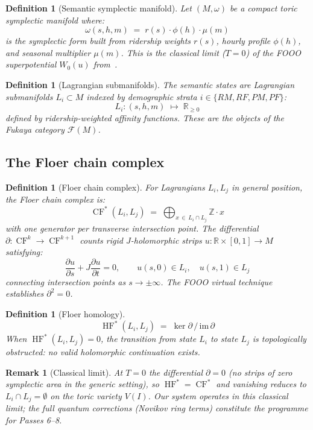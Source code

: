 \documentclass[11pt,a4paper]{article}
\newtheorem{definition}[theorem]{Definition}
\newtheorem{remark}[theorem]{Remark}
\DeclareMathOperator{\HF}{HF}
\DeclareMathOperator{\CF}{CF}
\newcommand{\Fuk}{\mathcal{F}}
\begin{document}
\begin{definition}[Semantic symplectic manifold]
Let $(M, \omega)$ be a compact toric symplectic manifold where:
\[
  \omega(s,h,m) \;=\; r(s)\cdot\phi(h)\cdot\mu(m)
\]
is the symplectic form built from ridership weights $r(s)$,
hourly profile $\phi(h)$, and seasonal multiplier $\mu(m)$.
This is the classical limit ($T=0$) of the FOOO superpotential
$W_0(u)$ from~\cite{FOOO}.
\end{definition}

\begin{definition}[Lagrangian submanifolds]
The \emph{semantic states} are Lagrangian submanifolds
$L_i \subset M$ indexed by demographic strata
$i \in \{RM, RF, PM, PF\}$:
\[
  L_i : (s,h,m) \;\mapsto\; \mathbb{R}_{\geq 0}
\]
defined by ridership-weighted affinity functions. These are the
objects of the Fukaya category $\Fuk(M)$.
\end{definition}

\subsection{The Floer chain complex}

\begin{definition}[Floer chain complex]
For Lagrangians $L_i, L_j$ in general position, the
\emph{Floer chain complex} is:
\[
  \CF^*(L_i, L_j) \;=\;
  \bigoplus_{x \,\in\, L_i \cap L_j} \mathbb{Z} \cdot x
\]
with one generator per transverse intersection point.
The differential $\partial: \CF^k \to \CF^{k+1}$ counts rigid
$J$-holomorphic strips $u: \mathbb{R} \times [0,1] \to M$
satisfying:
\[
  \frac{\partial u}{\partial s} + J\frac{\partial u}{\partial t} = 0,
  \qquad u(s,0) \in L_i,\quad u(s,1) \in L_j
\]
connecting intersection points as $s \to \pm\infty$.
The FOOO virtual technique~\cite{FOOO} establishes $\partial^2 = 0$.
\end{definition}

\begin{definition}[Floer homology]
\[
  \HF^*(L_i, L_j) \;=\; \ker\partial \,/\, \mathrm{im}\,\partial
\]
When $\HF^*(L_i, L_j) = 0$, the transition from state $L_i$ to
state $L_j$ is \emph{topologically obstructed}: no valid
holomorphic continuation exists.
\end{definition}

\begin{remark}[Classical limit]
At $T=0$ the differential $\partial = 0$ (no strips of zero
symplectic area in the generic setting), so $\HF^* = \CF^*$ and
vanishing reduces to $L_i \cap L_j = \emptyset$ on the toric
variety $V(I)$. Our system operates in this classical limit;
the full quantum corrections (Novikov ring terms) constitute
the programme for Passes 6--8.
\end{remark}
\end{document}
